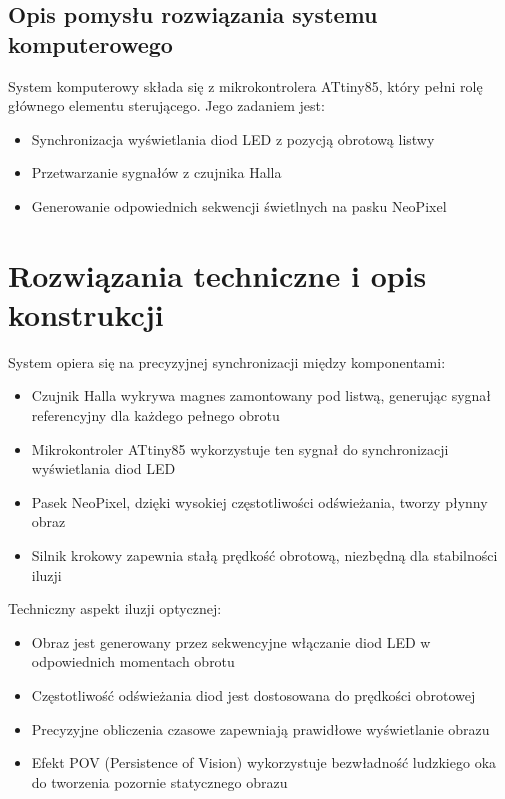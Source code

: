 \documentclass{article}
\begin{document}
\subsection{Opis pomysłu rozwiązania systemu komputerowego}
System komputerowy składa się z mikrokontrolera ATtiny85, który pełni rolę głównego elementu sterującego. Jego zadaniem jest:
\begin{itemize}
    \item Synchronizacja wyświetlania diod LED z pozycją obrotową listwy
    \item Przetwarzanie sygnałów z czujnika Halla
    \item Generowanie odpowiednich sekwencji świetlnych na pasku NeoPixel
\end{itemize}

\section{Rozwiązania techniczne i opis konstrukcji}
System opiera się na precyzyjnej synchronizacji między komponentami:
\begin{itemize}
    \item Czujnik Halla wykrywa magnes zamontowany pod listwą, generując sygnał referencyjny dla każdego pełnego obrotu
    \item Mikrokontroler ATtiny85 wykorzystuje ten sygnał do synchronizacji wyświetlania diod LED
    \item Pasek NeoPixel, dzięki wysokiej częstotliwości odświeżania, tworzy płynny obraz
    \item Silnik krokowy zapewnia stałą prędkość obrotową, niezbędną dla stabilności iluzji
\end{itemize}

Techniczny aspekt iluzji optycznej:
\begin{itemize}
    \item Obraz jest generowany przez sekwencyjne włączanie diod LED w odpowiednich momentach obrotu
    \item Częstotliwość odświeżania diod jest dostosowana do prędkości obrotowej
    \item Precyzyjne obliczenia czasowe zapewniają prawidłowe wyświetlanie obrazu
    \item Efekt POV (Persistence of Vision) wykorzystuje bezwładność ludzkiego oka do tworzenia pozornie statycznego obrazu
\end{itemize}

\end{document}

